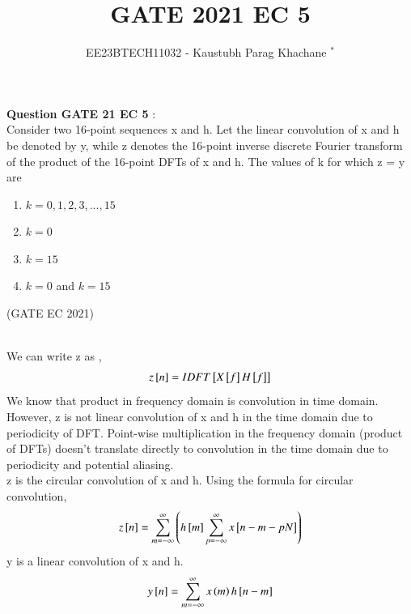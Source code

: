 \documentclass[journal,12pt,twocolumn]{IEEEtran}
\theoremstyle{remark}
\begin{document}

\vspace{3cm}

\Large\title{GATE 2021 EC 5}
\large\author{EE23BTECH11032 - Kaustubh Parag Khachane $^{*}$%
}
\maketitle
\newpage
\bigskip

\renewcommand{\thefigure}{\theenumi}
\renewcommand{\thetable}{\theenumi}
\large\textbf{Question GATE 21 EC 5} :\\
Consider two 16-point sequences x and h. Let the linear convolution of x and h be denoted by y, while z denotes the 16-point inverse discrete Fourier transform  of the product of the 16-point DFTs of x and h. The values of k for which z = y are 
\begin{enumerate}
    \item $k = 0, 1, 2, 3, ... , 15$
    \item $k = 0$
    \item $k = 15$
    \item $k = 0$ and $k = 15$
\end{enumerate}
\hfill(GATE EC 2021)\\
\solution\\
\fi

We can write z as ,
\begin{align}
    z{}\left[n\right] = IDFT{}\left[X{}\left[f\right]H{}\left[f\right]\right]
\end{align}
We know that product in frequency domain is convolution in time domain. However, z is not linear convolution of x and h in the time domain due to periodicity of DFT. Point-wise multiplication in the frequency domain (product of DFTs) doesn't translate directly to convolution in the time domain due to periodicity and potential aliasing.\\
z is the circular convolution of x and h. Using the formula for circular convolution,
\begin{align}
    z{}\left[n\right] = \sum_{m = -\infty}^{\infty}\left(h{}\left[m\right] \sum_{p = -\infty}^{\infty}x{}\left[n - m -pN\right]\right) \label{eq:eq1_g21ec5}
\end{align}
y is a linear convolution of x and h.
\begin{align}
    y{}\left[n\right] = \sum_{m = -\infty}^{\infty} x\left(m\right) h{}\left[n-m\right]
\end{align}
\end{document}
